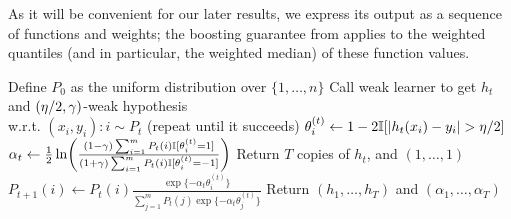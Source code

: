 As it will be convenient for our later results, we express
its output as a sequence
of functions and weights; 
the boosting guarantee from \citet{kegl2003robust} applies to the weighted quantiles (and in particular, the weighted median) of these function values.

\begin{algorithm}[H]
\label{alg:medboost}
\caption{($\{(x_i,y_i)\}_{i\in[m]}$,$T$,$\adv$,$\dev$)}
\begin{algorithmic}[1]
\State Define $P_{0}$ as the uniform distribution over $\{1,\ldots,n\}$
    \State Call weak learner to get $h_{t}$ and $(\eta/2,\gamma)$-weak hypothesis\\ 
    \hspace{0.625cm} w.r.t. $(x_{i},y_{i})\! :\! i \!\sim\! P_{t}$ (repeat until it succeeds)
        \State $\theta_{i}^{(t)} \gets 1 - 2 \mathbb{I}[ |h_{t}(x_{i}) - y_{i}| > \eta/2 ]$
    \EndFor
    \State $\alpha_{t} \gets \frac{1}{2} \ln\!\left( \frac{ (1-\gamma) \sum_{i=1}^{m} P_{t}(i) \mathbb{I}[ \theta_{i}^{(t)} = 1 ] }{ (1+\gamma) \sum_{i=1}^{m} P_{t}(i) \mathbb{I}[ \theta_{i}^{(t)} = -1 ] } \right)$
        \State Return $T$ copies of $h_{t}$, and $(1,\ldots,1)$
    \EndIf
        \State $P_{t+1}(i) \gets P_{t}(i) \frac{\exp\{-\alpha_{t}\theta_{i}^{(t)}\}}{\sum_{j=1}^{m} P_{t}(j) \exp\{-\alpha_{t}\theta_{j}^{(t)}\}}$
    \EndFor
\EndFor
\State Return $(h_{1},\ldots,h_{T})$ and $(\alpha_{1},\ldots,\alpha_{T})$ %
\end{algorithmic}
\end{algorithm}

